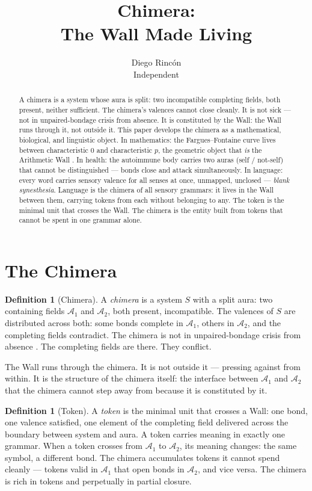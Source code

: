 \documentclass[12pt]{article}
\title{Chimera:\\
The Wall Made Living}
\author{Diego Rinc\'on\\
\small Independent}
\date{}
\theoremstyle{definition}
\newtheorem{definition}[theorem]{Definition}
\theoremstyle{remark}
\begin{document}
\maketitle

\begin{abstract}
A chimera is a system whose aura is split:
two incompatible completing fields, both present, neither sufficient.
The chimera's valences cannot close cleanly.
It is not sick --- not in unpaired-bondage crisis from absence.
It is constituted by the Wall: the Wall runs through it,
not outside it. This paper develops the chimera as a mathematical,
biological, and linguistic object. In mathematics: the
Fargues--Fontaine curve lives between characteristic $0$
and characteristic $p$, the geometric object that \emph{is}
the Arithmetic Wall \cite{synthesis}. In health: the autoimmune body
carries two auras (self / not-self) that cannot be distinguished ---
bonds close and attack simultaneously. In language:
every word carries sensory valence for all senses at once,
unmapped, unclosed --- \emph{blank synesthesia}.
Language is the chimera of all sensory grammars:
it lives in the Wall between them, carrying tokens from each
without belonging to any. The token is the minimal unit
that crosses the Wall. The chimera is the entity built from tokens
that cannot be spent in one grammar alone.
\end{abstract}

\section{The Chimera}

\begin{definition}[Chimera]
A \emph{chimera} is a system $S$ with a split aura:
two containing fields $\mathcal{A}_1$ and $\mathcal{A}_2$,
both present, incompatible. The valences of $S$ are distributed
across both: some bonds complete in $\mathcal{A}_1$,
others in $\mathcal{A}_2$, and the completing fields contradict.
The chimera is not in unpaired-bondage crisis from absence \cite{five}.
The completing fields are there. They conflict.

The Wall runs through the chimera.
It is not outside it --- pressing against from within.
It is the structure of the chimera itself:
the interface between $\mathcal{A}_1$ and $\mathcal{A}_2$
that the chimera cannot step away from
because it is constituted by it.
\end{definition}

\begin{definition}[Token]
A \emph{token} is the minimal unit that crosses a Wall:
one bond, one valence satisfied, one element of the completing field
delivered across the boundary between system and aura.
A token carries meaning in exactly one grammar.
When a token crosses from $\mathcal{A}_1$ to $\mathcal{A}_2$,
its meaning changes: the same symbol, a different bond.
The chimera accumulates tokens it cannot spend cleanly ---
tokens valid in $\mathcal{A}_1$ that open bonds in $\mathcal{A}_2$,
and vice versa. The chimera is rich in tokens
and perpetually in partial closure.
\end{definition}
\end{document}
